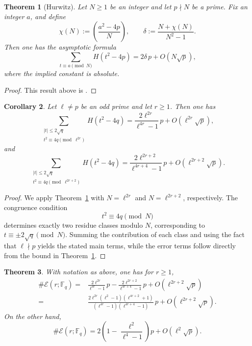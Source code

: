 \documentclass[table]{amsart}
\newtheorem{theorem}{Theorem}[section]
\newtheorem{corollary}[theorem]{Corollary}
\newcommand{\F}{\mathbb{F}}
\numberwithin{equation}{section}
\begin{document}
\begin{theorem}[Hurwitz]\label{thm:hurwitz}
Let $N\ge 1$ be an integer and let $p\nmid N$ be a prime. Fix an integer $a$, and define
\[
\chi(N):=\left(\frac{a^2-4p}{N}\right),
\qquad
\delta:=\frac{N+\chi(N)}{N^2-1}.
\]
Then one has the asymptotic formula
\[
\sum_{t\equiv a \!\!\!\pmod{N}} H(t^2-4p)
=2\delta\, p+O\!\left(N\sqrt{p}\right),
\]
where the implied constant is absolute.
\end{theorem}

\begin{proof}
This result above is \cite[Lemma 3]{dukeexceptional}.
\end{proof}

\begin{corollary}\label{cor:Er}
Let $\ell\neq p$ be an odd prime and let $r\ge 1$. Then one has
\[
\sum_{\substack{|t|\le 2\sqrt{q}\\ t^2\equiv 4q \!\!\!\pmod{\ell^{2r}}}}
H(t^2-4q)
=
\frac{2\ell^{2r}}{\ell^{4r}-1}\,p
+O\!\left(\ell^{2r}\sqrt{p}\right),
\]
and
\[
\sum_{\substack{|t|\le 2\sqrt{q}\\ t^2\equiv 4q \!\!\!\pmod{\ell^{2r+2}}}}
H(t^2-4q)
=
\frac{2\ell^{2r+2}}{\ell^{4r+4}-1}\,p
+O\!\left(\ell^{2r+2}\sqrt{p}\right).
\]
\end{corollary}

\begin{proof}
We apply Theorem~\ref{thm:hurwitz} with $N=\ell^{2r}$ and $N=\ell^{2r+2}$, respectively. The congruence condition
\[
t^2\equiv 4q \pmod{N}
\]
determines exactly two residue classes modulo $N$, corresponding to $t\equiv \pm 2\sqrt{q}\pmod{N}$. Summing the contribution of each class and using the fact that $\ell\nmid p$ yields the stated main terms, while the error terms follow directly from the bound in Theorem~\ref{thm:hurwitz}.
\end{proof}

\begin{theorem}\label{thm:main-density}
With notation as above, one has for $r\geq 1$,
\[
\begin{split}\#\mathcal{E}(r;\F_q)
=&
\frac{2\ell^{2r}}{\ell^{4r}-1}\,p
-
\frac{2\ell^{2r+2}}{\ell^{4r+4}-1}\,p
+O\!\left(\ell^{2r+2}\sqrt{p}\right)\\
=&
\frac{2\ell^{2r}(\ell^2-1)(\ell^{4r+2}+1)}
{(\ell^{4r}-1)(\ell^{4r+4}-1)}\,p
+O\!\left(\ell^{2r+2}\sqrt{p}\right).
\end{split}
\]
On the other hand, 
\[\#\mathcal{E}(r;\F_q)=2\left(1-\frac{\ell^2}{\ell^4-1}\right)p+O\left(\ell^2\sqrt{p}\right).\]
\end{theorem}
\end{document}
